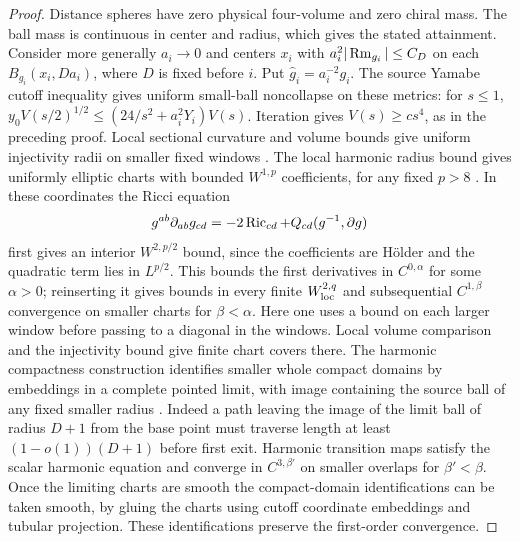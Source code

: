\begin{proof}
Distance spheres have zero physical four-volume and zero chiral
mass. The ball mass is continuous in center and radius, which
gives the stated attainment. Consider more generally \(a_i\to0\)
and centers \(x_i\) with \(a_i^2|\operatorname{Rm}_{g_i}|\le C_D\) on each
\(B_{g_i}(x_i,Da_i)\), where \(D\) is fixed before \(i\).
Put \(\widehat g_i=a_i^{-2}g_i\). The source Yamabe cutoff inequality
gives uniform small-ball noncollapse on these metrics:
for \(s\le1\), \(y_0 V(s/2)^{1/2}\le(24/s^2+a_i^2Y_i)V(s)\).
Iteration gives \(V(s)\ge cs^4\), as in the preceding proof.
Local sectional curvature and volume bounds give uniform injectivity
radii on smaller fixed windows \cite[\S4]{CheegerGromovTaylor1982}.
The local harmonic radius bound gives uniformly elliptic charts with bounded \(W^{1,p}\) coefficients, for any fixed \(p>8\) \cite[Theorem 0.3]{AndersonCheeger1992Harmonic}. In these coordinates the Ricci equation
\[
 g^{ab}\partial_{ab}g_{cd}=-2\operatorname{Ric}_{cd}+Q_{cd}(g^{-1},\partial g)
\]
first gives an interior \(W^{2,p/2}\) bound, since the coefficients are H\"older and the quadratic term lies in \(L^{p/2}\). This bounds the first derivatives in \(C^{0,\alpha}\) for some \(\alpha>0\); reinserting it gives bounds in every finite \(W^{2,q}_{\rm loc}\) and subsequential \(C^{1,\beta}\) convergence on smaller charts for \(\beta<\alpha\).
Here one uses a bound on each larger window before passing to
a diagonal in the windows. Local volume comparison and the
injectivity bound give finite chart covers there. The harmonic
compactness construction identifies smaller whole compact domains
by embeddings in a complete pointed limit, with image containing the source ball of any fixed smaller radius \cite[Theorem 3.1 and its proof]{BelegradekKapovitch2000Finiteness}.
Indeed a path leaving the image of the limit ball of radius \(D+1\)
from the base point must traverse length at least \((1-o(1))(D+1)\)
before first exit. Harmonic transition maps satisfy the scalar
harmonic equation and converge in \(C^{3,\beta'}\) on smaller
overlaps for \(\beta'<\beta\). Once the limiting charts are smooth
the compact-domain identifications can be taken smooth, by gluing
the charts using cutoff coordinate embeddings and tubular projection.
These identifications preserve the first-order convergence.


\end{proof}
